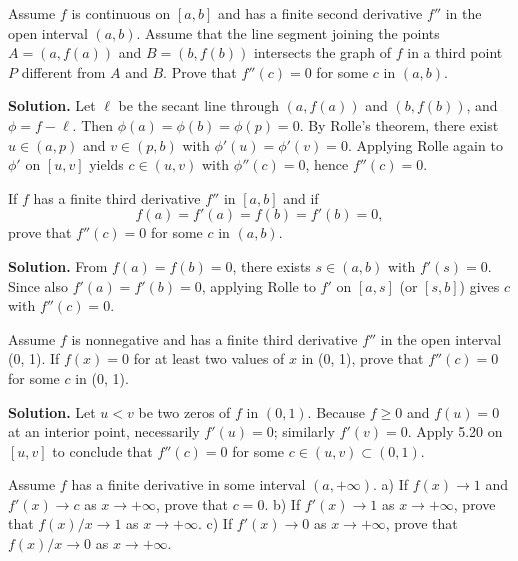 \begin{problembox}
Assume \( f \) is continuous on \( [a, b] \) and has a finite second derivative \( f'' \) in the open interval \( (a, b) \). Assume that the line segment joining the points \( A = (a, f(a)) \) and \( B = (b, f(b)) \) intersects the graph of \( f \) in a third point \( P \) different from \( A \) and \( B \). Prove that \( f''(c) = 0 \) for some \( c \) in \( (a, b) \).
\end{problembox}

\noindent\textbf{Solution.}
Let $\ell$ be the secant line through $(a,f(a))$ and $(b,f(b))$, and $\phi=f-\ell$. Then $\phi(a)=\phi(b)=\phi(p)=0$. By Rolle’s theorem, there exist $u\in(a,p)$ and $v\in(p,b)$ with $\phi'(u)=\phi'(v)=0$. Applying Rolle again to $\phi'$ on $[u,v]$ yields $c\in(u,v)$ with $\phi''(c)=0$, hence $f''(c)=0$.

\begin{problembox}
If \( f \) has a finite third derivative \( f'' \) in \( [a, b] \) and if
\[ f(a) = f'(a) = f(b) = f'(b) = 0, \]
prove that \( f''(c) = 0 \) for some \( c \) in \( (a, b) \).
\end{problembox}

\noindent\textbf{Solution.}
From $f(a)=f(b)=0$, there exists $s\in(a,b)$ with $f'(s)=0$. Since also $f'(a)=f'(b)=0$, applying Rolle to $f'$ on $[a,s]$ (or $[s,b]$) gives $c$ with $f''(c)=0$.

\begin{problembox}
Assume \( f \) is nonnegative and has a finite third derivative \( f'' \) in the open interval (0, 1). If \( f(x) = 0 \) for at least two values of \( x \) in (0, 1), prove that \( f''(c) = 0 \) for some \( c \) in (0, 1).
\end{problembox}

\noindent\textbf{Solution.}
Let $u<v$ be two zeros of $f$ in $(0,1)$. Because $f\ge 0$ and $f(u)=0$ at an interior point, necessarily $f'(u)=0$; similarly $f'(v)=0$. Apply 5.20 on $[u,v]$ to conclude that $f''(c)=0$ for some $c\in(u,v)\subset(0,1)$.

\begin{problembox}
Assume \( f \) has a finite derivative in some interval \( (a, +\infty) \).
a) If \( f(x) \to 1 \) and \( f'(x) \to c \) as \( x \to +\infty \), prove that \( c = 0 \).
b) If \( f'(x) \to 1 \) as \( x \to +\infty \), prove that \( f(x)/x \to 1 \) as \( x \to +\infty \).
c) If \( f'(x) \to 0 \) as \( x \to +\infty \), prove that \( f(x)/x \to 0 \) as \( x \to +\infty \).
\end{problembox}

